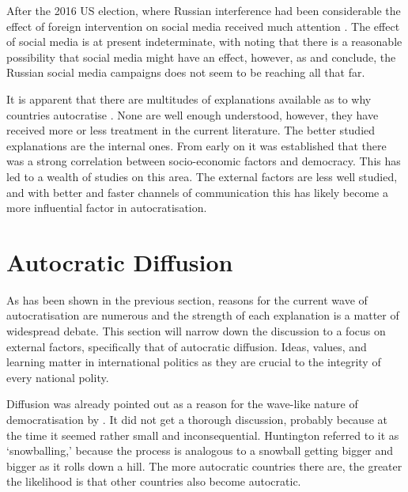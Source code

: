 After the 2016 US election, where Russian interference had been considerable \citep[pp. 14-15]{mueller_report_2019} the effect of foreign intervention on social media received much attention \citep{eady_exposure_2023, guess_reshares_2023, mueller_report_2019}. The effect of social media is at present indeterminate, with \citet{zhuravskaya_political_2020} noting that there is a reasonable possibility that social media might have an effect, however, as \citet{eady_exposure_2023} and \citet{guess_reshares_2023} conclude, the Russian social media campaigns does not seem to be reaching all that far. 

It is apparent that there are multitudes of explanations available as to why countries autocratise \citep{berman_causes_2021}. None are well enough understood, however, they have received more or less treatment in the current literature. The better studied explanations are the internal ones. From early on it was established that there was a strong correlation between socio-economic factors and democracy. This has led to a wealth of studies on this area. The external factors are less well studied, and with better and faster channels of communication this has likely become a more influential factor in autocratisation.

\section{Autocratic Diffusion}
As has been shown in the previous section, reasons for the current wave of autocratisation are numerous and the strength of each explanation is a matter of widespread debate. This section will narrow down the discussion to a focus on external factors, specifically that of autocratic diffusion. Ideas, values, and learning matter in international politics \citep[pp. 86-92]{mingst_essentials_2019} as they are crucial to the integrity of every national polity.

Diffusion was already pointed out as a reason for the wave-like nature of democratisation by \citet{huntington_third_1991}. It did not get a thorough discussion, probably because at the time it seemed rather small and inconsequential. Huntington referred to it as `snowballing,' because the process is analogous to a snowball getting bigger and bigger as it rolls down a hill. The more autocratic countries there are, the greater the likelihood is that other countries also become autocratic.


